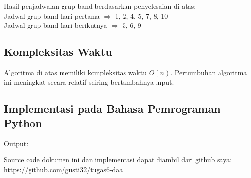 \documentclass[12pt]{article}
\begin{document}
	\noindent Hasil penjadwalan grup band berdasarkan penyelesaian di atas:
	\noindent \\Jadwal grup band hari pertama $\Rightarrow$ 1, 2, 4, 5, 7, 8, 10
	\noindent \\Jadwal grup band hari berikutnya $\Rightarrow$ 3, 6, 9
	
	\subsection*{Kompleksitas Waktu}
	Algoritma di atas memiliki kompleksitas waktu $O(n)$. Pertumbuhan algoritma ini meningkat secara 
	relatif seiring bertambahnya input.
	
	\newpage
	\subsection*{Implementasi pada Bahasa Pemrograman Python}
	
	Output:
	
	
	Source code dokumen ini dan implementasi dapat diambil dari github saya: \url{https://github.com/gusti32/tugas6-daa}
	
\end{document}
